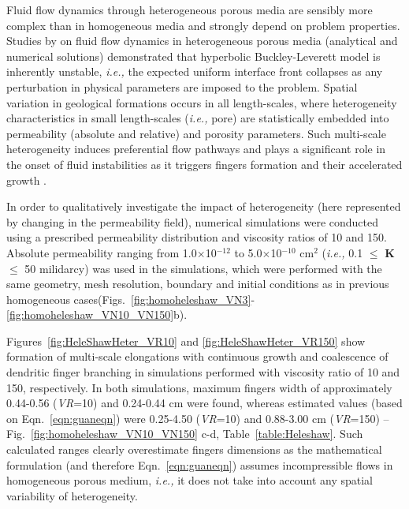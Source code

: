 \documentclass[preprint,authoryear,12pt]{elsarticle}
\newcommand{\ie}{{\it i.e., }}
\begin{document}
\medskip
Fluid flow dynamics through heterogeneous porous media are sensibly more complex than in homogeneous media and strongly depend on problem properties. Studies by \citet{langtangen_1992} on fluid flow dynamics in heterogeneous porous media (analytical and numerical solutions) demonstrated that hyperbolic Buckley-Leverett model is inherently unstable, \ie the expected uniform interface front collapses as any perturbation in physical parameters are imposed to the problem. Spatial variation in geological formations occurs in all length-scales, where heterogeneity characteristics in small length-scales (\ie pore) are statistically embedded into permeability (absolute and relative) and porosity parameters. Such multi-scale heterogeneity induces preferential flow pathways and plays a significant role in the onset of fluid instabilities as it triggers fingers formation and their accelerated growth \citep[see][]{ewing_1989,tchelepi_1994}.

\medskip
In order to qualitatively investigate the impact of heterogeneity (here represented by changing in the permeability field), numerical simulations were conducted using a prescribed permeability distribution and viscosity ratios of 10 and 150. Absolute permeability ranging from 1.0$\times$10$^{-12}$ to 5.0$\times$10$^{-10}$ cm$^{2}$ (\ie 0.1 $\le$ {\bf K} $\le$ 50 milidarcy) was used in the simulations, which were performed with the same geometry,  mesh resolution, boundary and initial conditions as in previous homogeneous cases(Figs.~\ref{fig:homoheleshaw_VN3}-\ref{fig:homoheleshaw_VN10_VN150}b). 

\medskip
Figures~\ref{fig:HeleShawHeter_VR10} and \ref{fig:HeleShawHeter_VR150} show formation of multi-scale elongations with continuous growth and coalescence of dendritic finger branching in simulations performed with viscosity ratio of 10 and 150, respectively. In both simulations, maximum fingers width of approximately 0.44-0.56 ({\it VR}=10) and 0.24-0.44 cm were found, whereas estimated values (based on Eqn.~\ref{eqn:guaneqn}) were 0.25-4.50 ({\it VR}=10) and 0.88-3.00 cm ({\it VR}=150) -- Fig.~\ref{fig:homoheleshaw_VN10_VN150} c-d, Table~\ref{table:Heleshaw}. Such calculated ranges \citep[\ie theoretical values based on analytic solutions due to][]{mclean_1981} clearly overestimate fingers dimensions as the mathematical formulation (and therefore Eqn.~\ref{eqn:guaneqn}) assumes incompressible flows in homogeneous porous medium, \ie it does not take into account any spatial variability of heterogeneity.       
     
\end{document}
